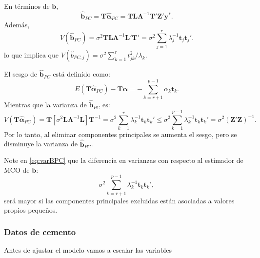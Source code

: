 \documentclass[
]{article}
\newenvironment{Shaded}{\begin{snugshade}}{\end{snugshade}}
\newcommand{\ControlFlowTok}[1]{\textcolor[rgb]{0.13,0.29,0.53}{\textbf{#1}}}
\newcommand{\DecValTok}[1]{\textcolor[rgb]{0.00,0.00,0.81}{#1}}
\newcommand{\FunctionTok}[1]{\textcolor[rgb]{0.00,0.00,0.00}{#1}}
\newcommand{\NormalTok}[1]{#1}
\newcommand{\OtherTok}[1]{\textcolor[rgb]{0.56,0.35,0.01}{#1}}
\newcommand{\SpecialCharTok}[1]{\textcolor[rgb]{0.00,0.00,0.00}{#1}}
\begin{document}
En términos de \(\boldsymbol b\),
\[
\widehat{\boldsymbol b}_{PC} = \boldsymbol T\widehat{\boldsymbol \alpha}_{PC} = \boldsymbol T\boldsymbol L\boldsymbol \Lambda^{-1}\boldsymbol T'\boldsymbol Z'\boldsymbol y^{*}.
\]
Además,
\[
V(\widehat{\boldsymbol b}_{PC}) = \sigma^{2} \boldsymbol T\boldsymbol L\boldsymbol \Lambda^{-1}\boldsymbol L'\boldsymbol T' = \sigma^{2}\sum_{j=1}^{r} \lambda_{j}^{-1}\boldsymbol t_{j}\boldsymbol t_{j}'.
\]
lo que implica que \(V(\widehat{b}_{PC,j}) = \sigma^{2} \sum_{k=1}^{r}t_{jk}^{2}/\lambda_{k}\).

El sesgo de \(\widehat{\boldsymbol b}_{PC}\) está definido como:
\[
E(\boldsymbol T\widehat{\boldsymbol \alpha}_{PC}) - \boldsymbol T\boldsymbol \alpha= -\sum_{k=r+1}^{p-1}\alpha_k\boldsymbol t_{k}.
\]
Mientras que la varianza de \(\widehat{\boldsymbol b}_{PC}\) es:
\begin{equation}
V(\boldsymbol T\widehat{\boldsymbol \alpha}_{PC}) = \boldsymbol T\left[ \sigma^{2}\boldsymbol L\boldsymbol \Lambda^{-1} \boldsymbol L\right] \boldsymbol T^{-1} = \sigma^{2} \sum_{k=1}^{r}\lambda_k^{-1}\boldsymbol t_{k}\boldsymbol t_{k}' \leq \sigma^{2} \sum_{k=1}^{p-1}\lambda_k^{-1}\boldsymbol t_{k}\boldsymbol t_{k}' = \sigma^{2}(\boldsymbol Z'\boldsymbol Z)^{-1}.
\label{eq:varBPC}
\end{equation}
Por lo tanto, al eliminar componentes principales se aumenta el sesgo, pero se disminuye la varianza de \(\widehat{\boldsymbol b}_{PC}\).

Note en \eqref{eq:varBPC} que la diferencia en varianzas con respecto al estimador de MCO de \(\boldsymbol b\):
\[
\sigma^{2}\sum_{k=r+1}^{p-1}\lambda_k^{-1} \boldsymbol t_{k}\boldsymbol t_{k}',
\]
será mayor si las componentes principales excluidas están asociadas a valores propios pequeños.

\hypertarget{datos-de-cemento-2}{%
\subsubsection{Datos de cemento}\label{datos-de-cemento-2}}

Antes de ajustar el modelo vamos a escalar las variables

\begin{Shaded}
\end{Shaded}
\end{document}
